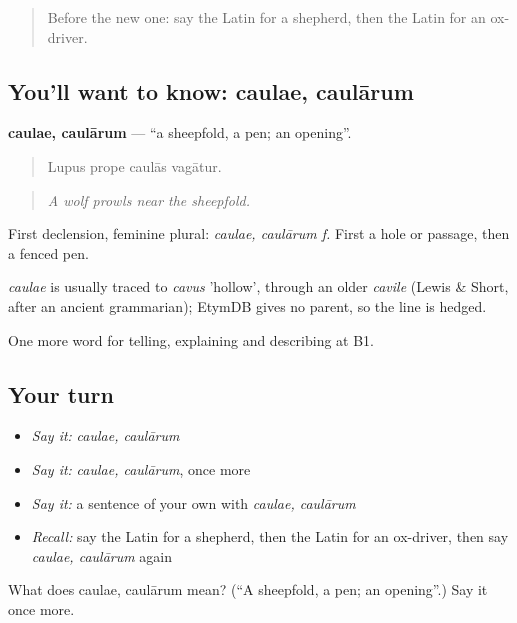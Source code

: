\begin{quote}
Before the new one: say the Latin for a shepherd, then the Latin for an ox-driver.
\end{quote}

\subsection*{You'll want to know: caulae, caulārum}
\textbf{caulae, caulārum} — \textquotedblleft{}a sheepfold, a pen; an opening\textquotedblright{}.

\begin{quote}
Lupus prope caulās vagātur.
\end{quote}

\begin{quote}
\emph{A wolf prowls near the sheepfold.}
\end{quote}

First declension, feminine plural: \emph{caulae, caulārum f.} First a hole or passage, then a fenced pen.

\begin{cousinweb}
\emph{caulae} is usually traced to \emph{cavus} 'hollow', through an older \emph{cavile} (Lewis \& Short, after an ancient grammarian); EtymDB gives no parent, so the line is hedged.
\end{cousinweb}

\begin{grammarlens}[title={What you've built}]
One more word for telling, explaining and describing at B1.
\end{grammarlens}

\subsection*{Your turn}
\begin{itemize}
\raggedright
  \item \emph{Say it:} \emph{caulae, caulārum}
  \item \emph{Say it:} \emph{caulae, caulārum}, once more
  \item \emph{Say it:} a sentence of your own with \emph{caulae, caulārum}
  \item \emph{Recall:} say the Latin for a shepherd, then the Latin for an ox-driver, then say \emph{caulae, caulārum} again
\end{itemize}

\begin{tcolorbox}[breakable,colback=teal!4,colframe=teal!35!black,title={Before you move on}]
What does caulae, caulārum mean? (\textquotedblleft{}A sheepfold, a pen; an opening\textquotedblright{}.) Say it once more.
\end{tcolorbox}
